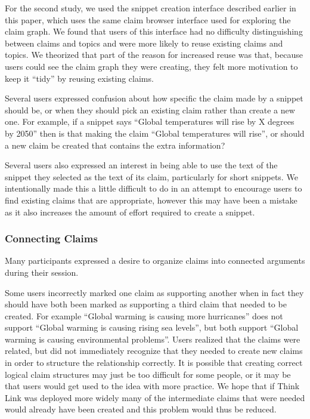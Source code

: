 \documentclass{chi2009}
\begin{document}
For the second study, we used the snippet creation interface described earlier in this paper, which uses the same claim browser interface used for exploring the claim graph. We found that users of this interface had no difficulty distinguishing between claims and topics and were more likely to reuse existing claims and topics. We theorized that part of the reason for increased reuse was that, because users could see the claim graph they were creating, they felt more motivation to keep it ``tidy'' by reusing existing claims.

Several users expressed confusion about how specific the claim made by a snippet should be, or when they should pick an existing claim rather than create a new one. For example, if a snippet says ``Global temperatures will rise by X degrees by 2050'' then is that making the claim ``Global temperatures will rise'', or should a new claim be created that contains the extra information? 

Several users also expressed an interest in being able to use the text of the snippet they selected as the text of its claim, particularly for short snippets. We intentionally made this a little difficult to do in an attempt to encourage users to find existing claims that are appropriate, however this may have been a mistake as it also increases the amount of effort required to create a snippet.

\subsubsection{Connecting Claims}

Many participants expressed a desire to organize claims into connected arguments during their session. 

Some users incorrectly marked one claim as supporting another when in fact they should have both been marked as supporting a third claim that needed to be created. For example ``Global warming is causing more hurricanes'' does not support ``Global warming is causing rising sea levels'', but both support ``Global warming is causing environmental problems''. Users realized that the claims were related, but did not immediately recognize that they needed to create new claims in order to structure the relationship correctly. It is possible that creating correct logical claim structures may just be too difficult for some people, or it may be that users would get used to the idea with more practice. We hope that if Think Link was deployed more widely many of the intermediate claims that were needed would already have been created and this problem would thus be reduced.
\end{document}
